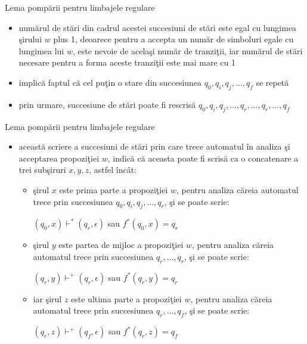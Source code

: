 \documentclass[pdf]{beamer}
\begin{document}
\begin{frame}{Lema pompării pentru limbajele regulare}
\begin{itemize}
\item
numărul de stări din cadrul acestei succesiuni de stări este egal cu lungimea şirului $ w $ plus 1, deoarece pentru a accepta un număr de simboluri egale cu lungimea lui $ w $, este nevoie de acelaşi număr de tranziţii, iar numărul de stări necesare pentru a forma aceste tranziţii este mai mare cu 1
\item
implică faptul că cel puţin o stare din succesiunea $ q_0, q_i, q_j, \dots, q_f $ se repetă
\item
prin urmare, succesiune de stări poate fi rescrisă $ q_0, q_i, q_j, \dots, q_r, \dots, q_r, \dots, q_f $
\end{itemize}
\end{frame}



\begin{frame}{Lema pompării pentru limbajele regulare}
\begin{itemize}
\item
această scriere a succesiuni de stări prin care trece automatul în analiza şi acceptarea propoziţiei $ w $, indică că aceasta poate fi scrisă ca o concatenare a trei subşiruri $ x, y, z $, astfel încât:
\begin{itemize}
\item
şirul $ x $ este prima parte a propoziţiei $ w $, pentru analiza căreia automatul trece prin succesiunea $ q_0, q_i, q_j, \dots, q_r$, şi se poate scrie:

$ (q_0,x) \vdash^* (q_r, \epsilon)  $ sau $ f^*(q_0, x) = q_r $
\item
şirul $ y $ este partea de mijloc a propoziţiei $ w $, pentru analiza căreia automatul trece prin succesiunea $ q_r, \dots, q_r$,  şi se poate scrie:

$ (q_r,y) \vdash^+ (q_r, \epsilon)  $ sau $ f^*(q_r, y) = q_r $
\item
iar şirul $ z $ este ultima parte a propoziţiei $ w $, pentru analiza căreia automatul trece prin succesiunea $q_r, \dots, q_f $, şi se poate scrie:

$ (q_r,z) \vdash^+ (q_f, \epsilon)  $ sau $ f^*(q_r, z) = q_f $
\end{itemize}
\end{itemize}
\end{frame}
\end{document}
